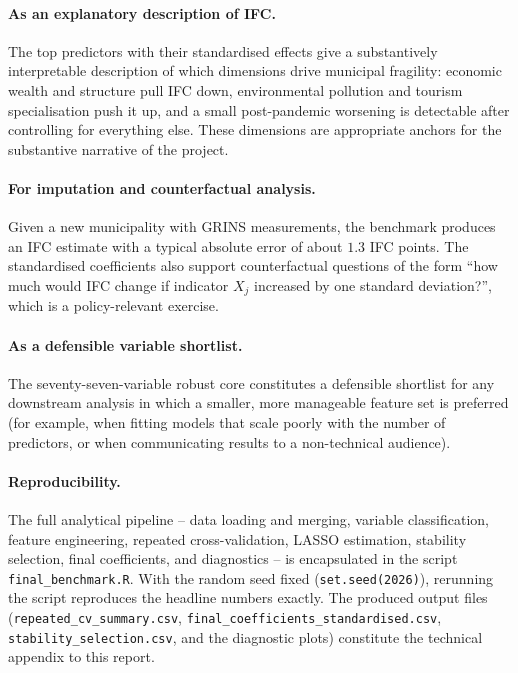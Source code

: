 \documentclass[11pt,a4paper]{article}
\begin{document}
\paragraph{As an explanatory description of IFC.}
The top predictors with their standardised effects give a substantively
interpretable description of which dimensions drive municipal
fragility: economic wealth and structure pull IFC down, environmental
pollution and tourism specialisation push it up, and a small
post-pandemic worsening is detectable after controlling for everything
else. These dimensions are appropriate anchors for the substantive
narrative of the project.

\paragraph{For imputation and counterfactual analysis.}
Given a new municipality with GRINS measurements, the benchmark
produces an IFC estimate with a typical absolute error of about
\(1.3\) IFC points. The standardised coefficients also support
counterfactual questions of the form ``how much would IFC change if
indicator \(X_{j}\) increased by one standard deviation?'', which is a
policy-relevant exercise.

\paragraph{As a defensible variable shortlist.}
The seventy-seven-variable robust core constitutes a defensible
shortlist for any downstream analysis in which a smaller, more
manageable feature set is preferred (for example, when fitting models
that scale poorly with the number of predictors, or when communicating
results to a non-technical audience).

\paragraph{Reproducibility.}
The full analytical pipeline -- data loading and merging, variable
classification, feature engineering, repeated cross-validation,
LASSO estimation, stability selection, final coefficients, and
diagnostics -- is encapsulated in the script \texttt{final\_benchmark.R}.
With the random seed fixed (\texttt{set.seed(2026)}), rerunning the
script reproduces the headline numbers exactly. The produced output
files (\texttt{repeated\_cv\_summary.csv},
\texttt{final\_coefficients\_standardised.csv},
\texttt{stability\_selection.csv}, and the diagnostic plots)
constitute the technical appendix to this report.
\end{document}
